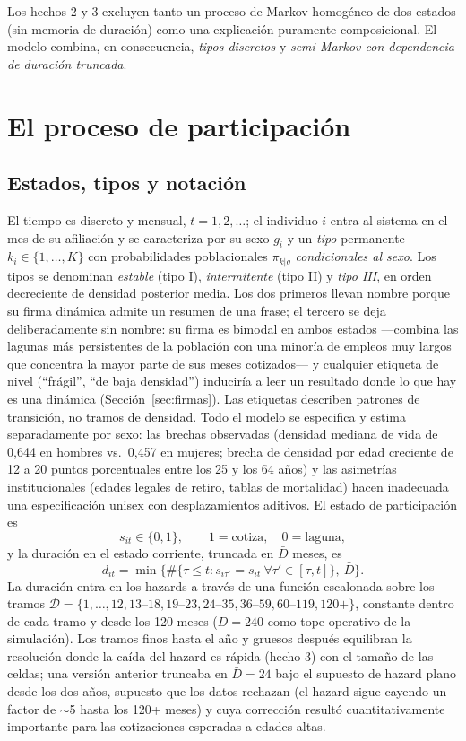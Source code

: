 \documentclass[11pt]{article}
\begin{document}
Los hechos 2 y 3 excluyen tanto un proceso de Markov homogéneo de dos estados
(sin memoria de duración) como una explicación puramente composicional. El
modelo combina, en consecuencia, \emph{tipos discretos} y
\emph{semi-Markov con dependencia de duración truncada}.

\section{El proceso de participación}

\subsection{Estados, tipos y notación}

El tiempo es discreto y mensual, $t = 1, 2, \dots$; el individuo $i$ entra al
sistema en el mes de su afiliación y se caracteriza por su sexo $g_i$ y un
\emph{tipo} permanente $k_i \in \{1,\dots,K\}$ con probabilidades
poblacionales $\pi_{k|g}$ \emph{condicionales al sexo}. Los tipos se
denominan \emph{estable} (tipo I), \emph{intermitente} (tipo II) y
\emph{tipo III}, en orden decreciente de densidad posterior media. Los dos
primeros llevan nombre porque su firma dinámica admite un resumen de una
frase; el tercero se deja deliberadamente sin nombre: su firma es bimodal
en ambos estados —combina las lagunas más persistentes de la población con
una minoría de empleos muy largos que concentra la mayor parte de sus meses
cotizados— y cualquier etiqueta de nivel (``frágil'', ``de baja
densidad'') induciría a leer un resultado donde lo que hay es una dinámica
(Sección~\ref{sec:firmas}). Las etiquetas describen patrones de transición,
no tramos de densidad. Todo el modelo se
especifica y estima separadamente por sexo: las brechas observadas (densidad
mediana de vida de 0,644 en hombres vs.\ 0,457 en mujeres; brecha de densidad
por edad creciente de 12 a 20 puntos porcentuales entre los 25 y los 64
años) y las asimetrías institucionales (edades legales de retiro, tablas de
mortalidad) hacen inadecuada una especificación unisex con desplazamientos
aditivos. El estado de participación es
\[
s_{it} \in \{0,1\}, \qquad 1 = \text{cotiza}, \quad 0 = \text{laguna},
\]
y la duración en el estado corriente, truncada en $\bar D$ meses, es
\[
d_{it} = \min\bigl\{\#\{\tau \le t : s_{i\tau'} = s_{it} \ \forall \tau' \in
[\tau, t]\},\ \bar D\bigr\}.
\]
La duración entra en los hazards a través de una función escalonada sobre
los tramos $\mathcal{D} = \{1, \dots, 12, 13\text{--}18, 19\text{--}23,
24\text{--}35, 36\text{--}59, 60\text{--}119, 120+\}$, constante dentro de
cada tramo y desde los 120 meses ($\bar D = 240$ como tope operativo de la
simulación). Los tramos finos hasta el año y gruesos después equilibran la
resolución donde la caída del hazard es rápida (hecho 3) con el tamaño de
las celdas; una versión anterior truncaba en $\bar D = 24$ bajo el supuesto
de hazard plano desde los dos años, supuesto que los datos rechazan (el
hazard sigue cayendo un factor de $\sim$5 hasta los 120+ meses) y cuya
corrección resultó cuantitativamente importante para las cotizaciones
esperadas a edades altas.
\end{document}
